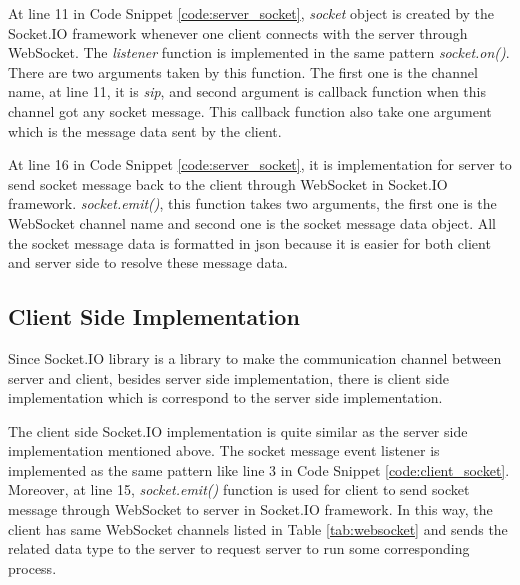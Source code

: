 \par At line 11 in Code Snippet \ref{code:server_socket}, \textit{socket} object is created by the Socket.IO framework whenever one client connects with the server through WebSocket. The \textit{listener} function is implemented in the same pattern \textit{socket.on()}. There are two arguments taken by this function. The first one is the channel name, at line 11, it is \textit{sip}, and second argument is callback function when this channel got any socket message. This callback function also take one argument which is the message data sent by the client.

\par At line 16 in Code Snippet \ref{code:server_socket}, it is implementation for server to send socket message back to the client through WebSocket in Socket.IO framework. \textit{socket.emit()}, this function takes two arguments, the first one is the WebSocket channel name and second one is the socket message data object. All the socket message data is formatted in \gls{json} because it is easier for both client and server side to resolve these message data.

\subsection{Client Side Implementation}

\par Since Socket.IO library is a library to make the communication channel between server and client, besides server side implementation, there is client side implementation which is correspond to the server side implementation.

\par The client side Socket.IO implementation is quite similar as the server side implementation mentioned above. The socket message event listener is implemented as the same pattern like line 3 in Code Snippet \ref{code:client_socket}. Moreover, at line 15, \textit{socket.emit()} function is used for client to send socket message through WebSocket to server in Socket.IO framework. In this way, the client has same WebSocket channels listed in Table \ref{tab:websocket} and sends the related data type to the server to request server to run some corresponding process.

